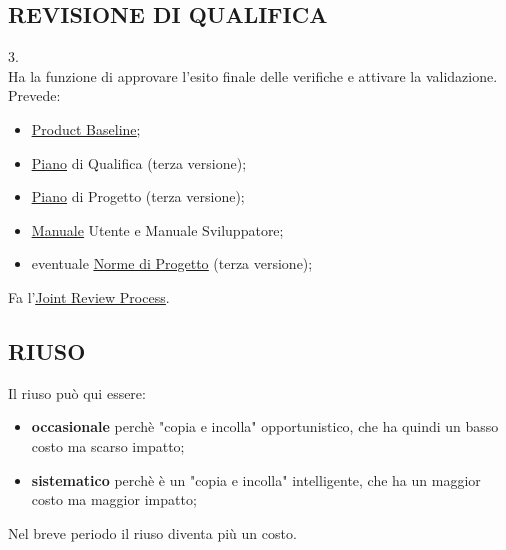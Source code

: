 		\subsection{REVISIONE DI QUALIFICA}  \label{RQ} 
		3. \\
		Ha la funzione di approvare l’esito finale delle verifiche e attivare la validazione.
		Prevede:
		\begin{itemize}
			\item \underline{\hyperref[productbaseline]{Product Baseline}};
			\item \underline{\hyperref[piano]{Piano}} di Qualifica (terza versione);
			\item \underline{\hyperref[piano]{Piano}} di Progetto (terza versione);
			\item \underline{\hyperref[manuali]{Manuale}} Utente e Manuale Sviluppatore;
			\item eventuale \underline{\hyperref[norme]{Norme di Progetto}} (terza versione);
		\end{itemize}
		Fa l'\underline{\hyperref[joint]{Joint Review Process}}.
		
		\subsection{RIUSO}  \label{riuso} 
		Il riuso può qui essere:
			\begin{itemize}
				\item \textbf{occasionale} perchè "copia e incolla" opportunistico, che ha quindi un basso costo ma scarso impatto;
				\item \textbf{sistematico} perchè è un "copia e incolla" intelligente, che ha un maggior costo ma maggior impatto;
			\end{itemize}
		Nel breve periodo il riuso diventa più un costo.
		
		
